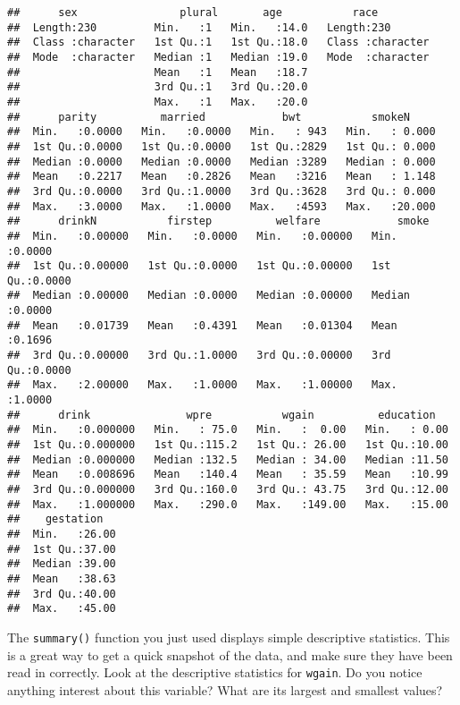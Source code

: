 \documentclass[
]{article}
\begin{document}
\begin{verbatim}
##      sex                plural       age           race          
##  Length:230         Min.   :1   Min.   :14.0   Length:230        
##  Class :character   1st Qu.:1   1st Qu.:18.0   Class :character  
##  Mode  :character   Median :1   Median :19.0   Mode  :character  
##                     Mean   :1   Mean   :18.7                     
##                     3rd Qu.:1   3rd Qu.:20.0                     
##                     Max.   :1   Max.   :20.0                     
##      parity          married            bwt           smokeN      
##  Min.   :0.0000   Min.   :0.0000   Min.   : 943   Min.   : 0.000  
##  1st Qu.:0.0000   1st Qu.:0.0000   1st Qu.:2829   1st Qu.: 0.000  
##  Median :0.0000   Median :0.0000   Median :3289   Median : 0.000  
##  Mean   :0.2217   Mean   :0.2826   Mean   :3216   Mean   : 1.148  
##  3rd Qu.:0.0000   3rd Qu.:1.0000   3rd Qu.:3628   3rd Qu.: 0.000  
##  Max.   :3.0000   Max.   :1.0000   Max.   :4593   Max.   :20.000  
##      drinkN           firstep          welfare            smoke       
##  Min.   :0.00000   Min.   :0.0000   Min.   :0.00000   Min.   :0.0000  
##  1st Qu.:0.00000   1st Qu.:0.0000   1st Qu.:0.00000   1st Qu.:0.0000  
##  Median :0.00000   Median :0.0000   Median :0.00000   Median :0.0000  
##  Mean   :0.01739   Mean   :0.4391   Mean   :0.01304   Mean   :0.1696  
##  3rd Qu.:0.00000   3rd Qu.:1.0000   3rd Qu.:0.00000   3rd Qu.:0.0000  
##  Max.   :2.00000   Max.   :1.0000   Max.   :1.00000   Max.   :1.0000  
##      drink               wpre           wgain          education    
##  Min.   :0.000000   Min.   : 75.0   Min.   :  0.00   Min.   : 0.00  
##  1st Qu.:0.000000   1st Qu.:115.2   1st Qu.: 26.00   1st Qu.:10.00  
##  Median :0.000000   Median :132.5   Median : 34.00   Median :11.50  
##  Mean   :0.008696   Mean   :140.4   Mean   : 35.59   Mean   :10.99  
##  3rd Qu.:0.000000   3rd Qu.:160.0   3rd Qu.: 43.75   3rd Qu.:12.00  
##  Max.   :1.000000   Max.   :290.0   Max.   :149.00   Max.   :15.00  
##    gestation    
##  Min.   :26.00  
##  1st Qu.:37.00  
##  Median :39.00  
##  Mean   :38.63  
##  3rd Qu.:40.00  
##  Max.   :45.00
\end{verbatim}

The \texttt{summary()} function you just used displays simple
descriptive statistics. This is a great way to get a quick snapshot of
the data, and make sure they have been read in correctly. Look at the
descriptive statistics for \texttt{wgain}. Do you notice anything
interest about this variable? What are its largest and smallest values?
\end{document}
